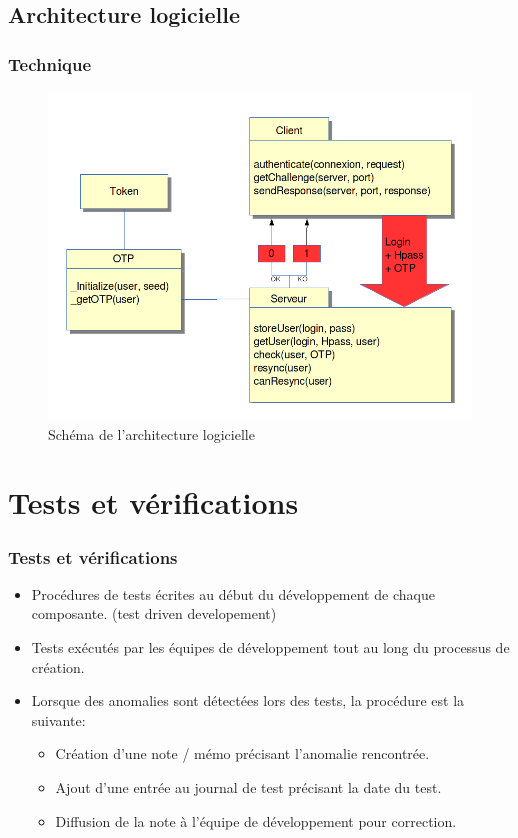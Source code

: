 \documentclass[xcolor=table]{beamer}
\begin{document}
\subsection{Architecture logicielle}
\begin{frame}
\frametitle{Technique}
\begin{figure}
 \includegraphics[scale=0.3]{img/architecture.png} 
 \caption{Schéma de l'architecture logicielle}
\end{figure}

\end{frame}


\section{Tests et vérifications}

\begin{frame}
  \frametitle{Tests et vérifications}
  \begin{itemize}
   \item Procédures de tests écrites au début du développement de chaque composante. (test driven developement)
   \item Tests exécutés par les équipes de développement tout au long du processus de création.
   \item  Lorsque des anomalies sont détectées lors des tests, la procédure est la suivante:
    \begin{itemize}
     \item Création d'une note / mémo précisant l'anomalie rencontrée.
     \item Ajout d'une entrée au journal de test précisant la date du test.
     \item Diffusion de la note à l'équipe de développement pour correction.
    \end{itemize}
  \end{itemize}
\end{frame}
\end{document}
